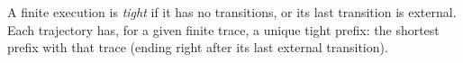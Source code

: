 \begin{definition}
  \label{def:istight}
  \leanok
  A finite execution is \emph{tight} if it has no transitions, or its last
  transition is external. Each trajectory has, for a given finite trace, a unique
  tight prefix: the shortest prefix with that trace (ending right after its last
  external transition).
\end{definition}
